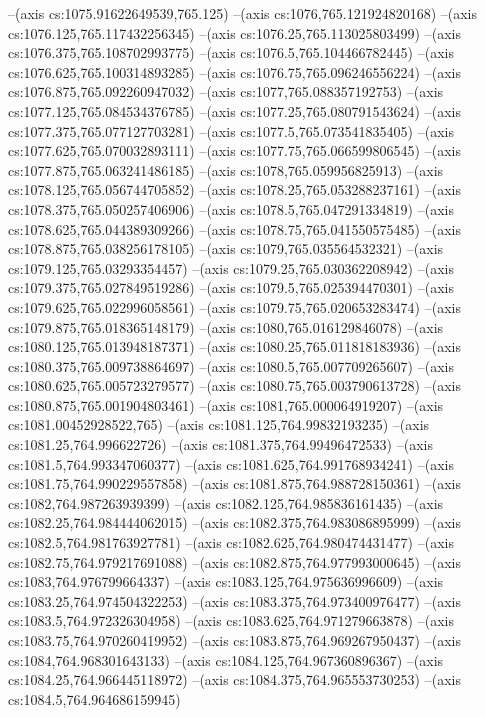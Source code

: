 --(axis cs:1075.91622649539,765.125)
--(axis cs:1076,765.121924820168)
--(axis cs:1076.125,765.117432256345)
--(axis cs:1076.25,765.113025803499)
--(axis cs:1076.375,765.108702993775)
--(axis cs:1076.5,765.104466782445)
--(axis cs:1076.625,765.100314893285)
--(axis cs:1076.75,765.096246556224)
--(axis cs:1076.875,765.092260947032)
--(axis cs:1077,765.088357192753)
--(axis cs:1077.125,765.084534376785)
--(axis cs:1077.25,765.080791543624)
--(axis cs:1077.375,765.077127703281)
--(axis cs:1077.5,765.073541835405)
--(axis cs:1077.625,765.070032893111)
--(axis cs:1077.75,765.066599806545)
--(axis cs:1077.875,765.063241486185)
--(axis cs:1078,765.059956825913)
--(axis cs:1078.125,765.056744705852)
--(axis cs:1078.25,765.053288237161)
--(axis cs:1078.375,765.050257406906)
--(axis cs:1078.5,765.047291334819)
--(axis cs:1078.625,765.044389309266)
--(axis cs:1078.75,765.041550575485)
--(axis cs:1078.875,765.038256178105)
--(axis cs:1079,765.035564532321)
--(axis cs:1079.125,765.03293354457)
--(axis cs:1079.25,765.030362208942)
--(axis cs:1079.375,765.027849519286)
--(axis cs:1079.5,765.025394470301)
--(axis cs:1079.625,765.022996058561)
--(axis cs:1079.75,765.020653283474)
--(axis cs:1079.875,765.018365148179)
--(axis cs:1080,765.016129846078)
--(axis cs:1080.125,765.013948187371)
--(axis cs:1080.25,765.011818183936)
--(axis cs:1080.375,765.009738864697)
--(axis cs:1080.5,765.007709265607)
--(axis cs:1080.625,765.005723279577)
--(axis cs:1080.75,765.003790613728)
--(axis cs:1080.875,765.001904803461)
--(axis cs:1081,765.000064919207)
--(axis cs:1081.00452928522,765)
--(axis cs:1081.125,764.99832193235)
--(axis cs:1081.25,764.996622726)
--(axis cs:1081.375,764.99496472533)
--(axis cs:1081.5,764.993347060377)
--(axis cs:1081.625,764.991768934241)
--(axis cs:1081.75,764.990229557858)
--(axis cs:1081.875,764.988728150361)
--(axis cs:1082,764.987263939399)
--(axis cs:1082.125,764.985836161435)
--(axis cs:1082.25,764.984444062015)
--(axis cs:1082.375,764.983086895999)
--(axis cs:1082.5,764.981763927781)
--(axis cs:1082.625,764.980474431477)
--(axis cs:1082.75,764.979217691088)
--(axis cs:1082.875,764.977993000645)
--(axis cs:1083,764.976799664337)
--(axis cs:1083.125,764.975636996609)
--(axis cs:1083.25,764.974504322253)
--(axis cs:1083.375,764.973400976477)
--(axis cs:1083.5,764.972326304958)
--(axis cs:1083.625,764.971279663878)
--(axis cs:1083.75,764.970260419952)
--(axis cs:1083.875,764.969267950437)
--(axis cs:1084,764.968301643133)
--(axis cs:1084.125,764.967360896367)
--(axis cs:1084.25,764.966445118972)
--(axis cs:1084.375,764.965553730253)
--(axis cs:1084.5,764.964686159945)
